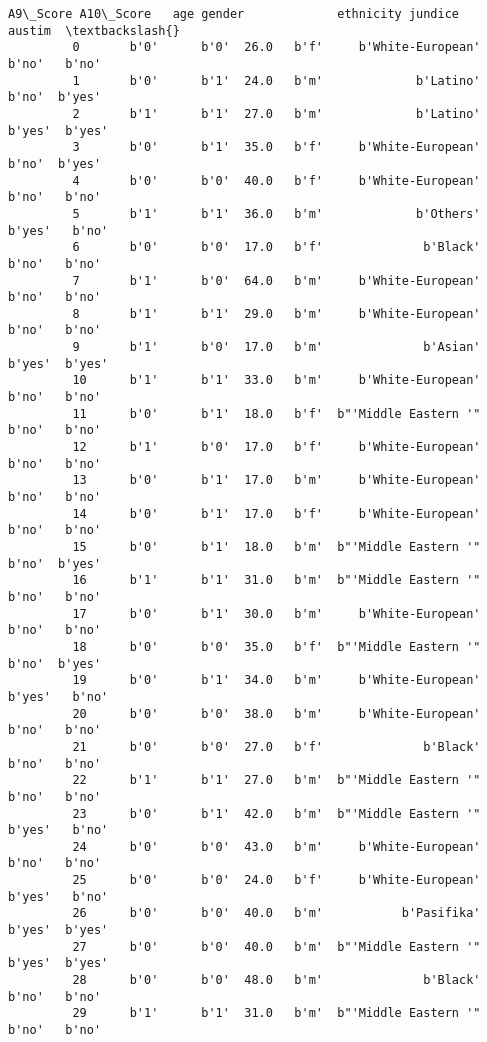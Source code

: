 \documentclass[11pt]{article}
\begin{document}
\begin{Verbatim}[commandchars=\\\{\}]
             A9\_Score A10\_Score   age gender             ethnicity jundice  austim  \textbackslash{}
         0       b'0'      b'0'  26.0   b'f'     b'White-European'   b'no'   b'no'   
         1       b'0'      b'1'  24.0   b'm'             b'Latino'   b'no'  b'yes'   
         2       b'1'      b'1'  27.0   b'm'             b'Latino'  b'yes'  b'yes'   
         3       b'0'      b'1'  35.0   b'f'     b'White-European'   b'no'  b'yes'   
         4       b'0'      b'0'  40.0   b'f'     b'White-European'   b'no'   b'no'   
         5       b'1'      b'1'  36.0   b'm'             b'Others'  b'yes'   b'no'   
         6       b'0'      b'0'  17.0   b'f'              b'Black'   b'no'   b'no'   
         7       b'1'      b'0'  64.0   b'm'     b'White-European'   b'no'   b'no'   
         8       b'1'      b'1'  29.0   b'm'     b'White-European'   b'no'   b'no'   
         9       b'1'      b'0'  17.0   b'm'              b'Asian'  b'yes'  b'yes'   
         10      b'1'      b'1'  33.0   b'm'     b'White-European'   b'no'   b'no'   
         11      b'0'      b'1'  18.0   b'f'  b"'Middle Eastern '"   b'no'   b'no'   
         12      b'1'      b'0'  17.0   b'f'     b'White-European'   b'no'   b'no'   
         13      b'0'      b'1'  17.0   b'm'     b'White-European'   b'no'   b'no'   
         14      b'0'      b'1'  17.0   b'f'     b'White-European'   b'no'   b'no'   
         15      b'0'      b'1'  18.0   b'm'  b"'Middle Eastern '"   b'no'  b'yes'   
         16      b'1'      b'1'  31.0   b'm'  b"'Middle Eastern '"   b'no'   b'no'   
         17      b'0'      b'1'  30.0   b'm'     b'White-European'   b'no'   b'no'   
         18      b'0'      b'0'  35.0   b'f'  b"'Middle Eastern '"   b'no'  b'yes'   
         19      b'0'      b'1'  34.0   b'm'     b'White-European'  b'yes'   b'no'   
         20      b'0'      b'0'  38.0   b'm'     b'White-European'   b'no'   b'no'   
         21      b'0'      b'0'  27.0   b'f'              b'Black'   b'no'   b'no'   
         22      b'1'      b'1'  27.0   b'm'  b"'Middle Eastern '"   b'no'   b'no'   
         23      b'0'      b'1'  42.0   b'm'  b"'Middle Eastern '"  b'yes'   b'no'   
         24      b'0'      b'0'  43.0   b'm'     b'White-European'   b'no'   b'no'   
         25      b'0'      b'0'  24.0   b'f'     b'White-European'  b'yes'   b'no'   
         26      b'0'      b'0'  40.0   b'm'           b'Pasifika'  b'yes'  b'yes'   
         27      b'0'      b'0'  40.0   b'm'  b"'Middle Eastern '"  b'yes'  b'yes'   
         28      b'0'      b'0'  48.0   b'm'              b'Black'   b'no'   b'no'   
         29      b'1'      b'1'  31.0   b'm'  b"'Middle Eastern '"   b'no'   b'no'   

\end{Verbatim}
\end{document}
